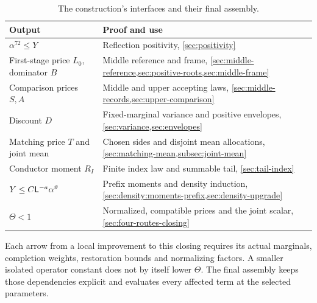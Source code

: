 \begin{table}[htbp]
\centering\small
\caption{The construction's interfaces and their final assembly.}
\label{tab:walk:glance}
\begin{tabular}{@{}>{\raggedright\arraybackslash}p{}%
>{\raggedright\arraybackslash}p{}@{}}
\toprule
Output & Proof and use\\
\midrule
$\alpha^{72}\le Y$ & Reflection positivity, \cref{sec:positivity}\\
First-stage price $L_0$, dominator $B$ & Middle reference and frame,
\cref{sec:middle-reference,sec:positive-roots,sec:middle-frame}\\
Comparison prices $S,A$ & Middle and upper accepting laws,
\cref{sec:middle-records,sec:upper-comparison}\\
Discount $D$ & Fixed-marginal variance and positive envelopes,
\cref{sec:variance,sec:envelopes}\\
Matching price $T$ and joint mean & Chosen sides and disjoint mean
allocations, \cref{sec:matching-mean,subsec:joint-mean}\\
Conductor moment $R_I$ & Finite index law and summable tail,
\cref{sec:tail-index}\\
$Y\le C\mathsf L^{-a}\alpha^\vartheta$ & Prefix moments and density induction,
\cref{sec:density:moments-prefix,sec:density-upgrade}\\
$\Theta<1$ & Normalized, compatible prices and the joint scalar,
\cref{sec:four-routes-closing}\\
\bottomrule
\end{tabular}
\end{table}

Each arrow from a local improvement to this closing requires its
actual marginals, completion weights, restoration bounds and
normalizing factors. A smaller isolated operator constant does not
by itself lower $\Theta$. The final assembly keeps those dependencies
explicit and evaluates every affected term at the selected parameters.
